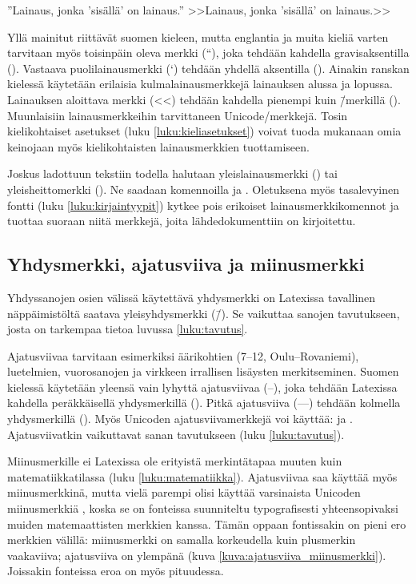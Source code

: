 \begin{koodilohkosis}
  ''Lainaus, jonka 'sisällä' on lainaus.''
  >>Lainaus, jonka 'sisällä' on lainaus.>>
\end{koodilohkosis}

Yllä mainitut riittävät suomen kieleen, mutta englantia ja muita kieliä
varten tarvitaan myös toisinpäin oleva merkki (``), joka tehdään
kahdella gra\-vis\-ak\-sen\-til\-la (). Vastaava
puolilainausmerkki (`) tehdään yhdellä aksentilla (). Ainakin
ranskan kielessä käytetään erilaisia kulmalainausmerkkejä lainauksen
alussa ja lopussa. Lainauksen aloittava merkki (<<) tehdään kahdella
pienempi kuin \=/merkillä (\koodi{<<}). Muunlaisiin lainausmerkkeihin
tarvittaneen Unicode\-/merkkejä. Tosin kielikohtaiset asetukset (luku
\ref{luku:kieliasetukset}) voivat tuoda mukanaan omia keinojaan myös
kielikohtaisten lainausmerkkien tuottamiseen.

Joskus ladottuun tekstiin todella halutaan yleislainausmerkki
(\textquotedbl) tai yleisheittomerkki (\textquotesingle). Ne saadaan
komennoilla  ja .
Oletuksena myös tasalevyinen fontti (luku \ref{luku:kirjaintyypit})
kytkee pois erikoiset lainausmerkkikomennot ja tuottaa suoraan niitä
merkkejä, joita lähdedokumenttiin on kirjoitettu.

\subsection{Yhdysmerkki, ajatusviiva ja miinusmerkki}

Yhdyssanojen osien välissä käytettävä yhdysmerkki on Latexissa
tavallinen näppäimistöltä saatava yleis\-yhdysmerkki (\=/). Se vaikuttaa
sanojen tavutukseen, josta on tarkempaa tietoa luvussa
\ref{luku:tavutus}.

Ajatusviivaa tarvitaan esimerkiksi äärikohtien (7--12,
Oulu--Rova\-niemi), luetelmien, vuorosanojen ja virkkeen irrallisen
lisäysten merkitseminen. Suomen kielessä käytetään yleensä vain lyhyttä
ajatusviivaa \mbox{(--)}, joka tehdään Latexissa kahdella peräkkäisellä
yhdysmerkillä (\koodi{--}). Pitkä ajatusviiva \mbox{(---)} tehdään
kolmella yhdysmerkillä (\koodi{---}). Myös Unicoden ajatusviivamerkkejä
voi käyttää:  ja .
Ajatusviivatkin vaikuttavat sanan tavutukseen (luku \ref{luku:tavutus}).

Miinusmerkille ei Latexissa ole erityistä merkintätapaa muuten kuin
matematiikkatilassa (luku \ref{luku:matematiikka}). Ajatusviivaa saa
käyttää myös miinusmerkkinä, mutta vielä parempi olisi käyttää
varsinaista Unicoden miinusmerkkiä , koska se
on fonteissa suunniteltu typografisesti yhteensopivaksi muiden
matemaattisten merkkien kanssa. Tämän oppaan fontissakin on pieni ero
merkkien välillä: miinusmerkki on samalla korkeudella kuin plusmerkin
vaakaviiva; ajatusviiva on ylempänä (kuva
\ref{kuva:ajatusviiva_miinusmerkki}). Joissakin fonteissa eroa on myös
pituudessa.

